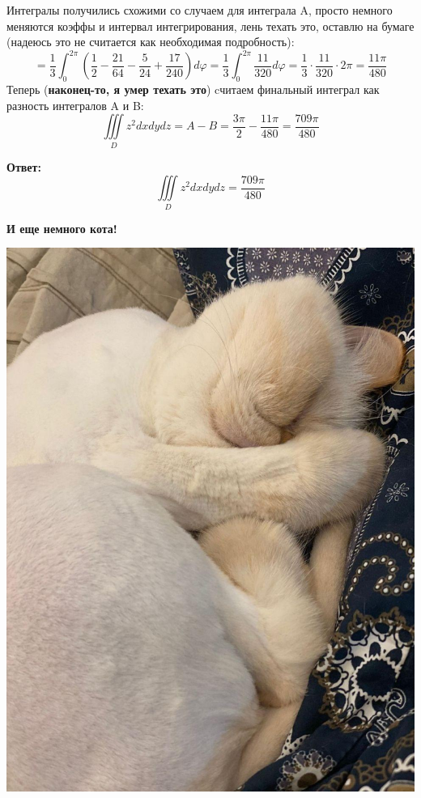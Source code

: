 \documentclass[a4paper,12pt]{article}
\begin{document}
Интегралы получились схожими со случаем для интеграла A, просто немного меняются коэффы и интервал интегрирования, лень техать это, оставлю на бумаге (надеюсь это не считается как необходимая подробность):
\[
=
 \frac{1}{3}\int_0^{2\pi}  \left(\frac{1}{2} - \frac{21}{64} - \frac{5}{24} + \frac{17}{240}
\right) d \varphi = \frac{1}{3}\int_0^{2\pi}   \frac{11}{320}d \varphi = \frac{1}{3} \cdot \frac{11}{320} \cdot 2\pi =  \frac{11\pi}{480}
\]
Теперь (\textbf{наконец-то, я умер техать это}) cчитаем финальный интеграл как разность интегралов A и B:
\[
\iiint\limits_D  z^2 dxdydz = A - B = \frac{3\pi}{2} -\frac{11\pi}{480} = \frac{709\pi}{480}
\]
\begin{center}
\textbf{Ответ: } 
\[
\iiint\limits_D  z^2 dxdydz =  \frac{709\pi}{480}
\]
\end{center}
\clearpage
{\Large \begin{center}
\textbf{И еще немного кота!}
\end{center}}
\begin{center}
\includegraphics[scale=0.5]{9.jpg}
\end{center}
\end{document}
